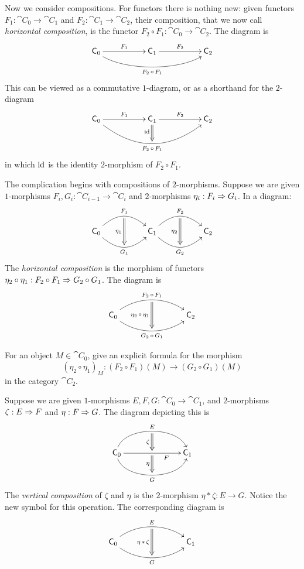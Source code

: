 Now we consider compositions. For functors there is nothing new: given functors 
$F_1 : \cat{C}_{0} \to \cat{C}_{1}$ and 
$F_2 : \cat{C}_{1} \to \cat{C}_{2}$, their composition, that we now call 
{\em horizontal composition}, is the functor
$F_2 \circ F_1 : \cat{C}_{0} \to \cat{C}_{2}$. The diagram is 
\[ \UseTips  \xymatrix @C=12ex @R=6ex {
\cat{C}_0
\ar[r]^(0.5){F_1} 
\ar@(dr,dl)[rr]_(0.5){F_2 \, \circ \, F_1}  
&
\cat{C}_1
\ar[r]^(0.5){F_2} 
&
\cat{C}_2
} \]
This can be viewed as a commutative $1$-diagram, or as a shorthand for the 
$2$-diagram
\[ \UseTips  \xymatrix @C=12ex @R=6ex {
\cat{C}_0
\ar[r]^(0.5){F_1}
\ar @/_3em/ [rr]_(0.5){F_2 \, \circ \, F_1} _(0.5){}="t"
&
\cat{C}_1
\ar[r]^(0.5){F_2} 
\ar@{=>}  ; "t" _(0.5){\opn{id}}
&
\cat{C}_2
} \]
in which $\operatorname{id}$ is the identity $2$-morphism of $F_2 \circ F_1$. 

The complication begins with compositions of $2$-morphisms. 
Suppose we are given $1$-morphisms
$F_i, G_i : \cat{C}_{i - 1} \to \cat{C}_{i}$
and $2$-morphisms $\eta_i : F_i \Rightarrow G_i$. In a diagram: 
\[ \UseTips  \xymatrix @C=12ex @R=6ex {
\cat{C}_0
\ar@(ur,ul)[r]^(0.5){F_1} _(0.5){}="eta1-s"
\ar@(dr,dl)[r]_(0.5){G_1}  ^(0.5){}="eta1-t"
\ar@{=>}  "eta1-s";"eta1-t" _(0.5){\eta_1}
&
\cat{C}_1
\ar@(ur,ul)[r]^(0.5){F_2} _(0.5){}="eta2-s"
\ar@(dr,dl)[r]_(0.5){G_2}  ^(0.5){}="eta2-t"
\ar@{=>}  "eta2-s";"eta2-t" _(0.5){\eta_2}
&
\cat{C}_2
} \]
The {\em horizontal composition} is the morphism of functors 
$\eta_2 \circ \eta_1 : F_2 \circ F_1  \Rightarrow G_2 \circ G_1$.
The diagram is 
\[ \UseTips  \xymatrix @C=18ex @R=6ex {
\cat{C}_0
\ar@(ur,ul)[r]^(0.5){F_2 \, \circ \, F_1} _(0.5){}="eta-s"
\ar@(dr,dl)[r]_(0.5){G_2 \, \circ \, G_1}  ^(0.5){}="eta-t"
\ar@{=>}  "eta-s";"eta-t" _(0.5){\eta_2 \, \circ \, \eta_1}
&
\cat{C}_2
} \] 

\begin{exer} \label{exer:1314}
For an object $M \in \cat{C}_0$, give an explicit formula for the morphism 
\[ (\eta_2 \circ \eta_1)_M : (F_2 \circ F_1)(M) \to (G_2 \circ G_1)(M) \]
in the category $\cat{C}_2$.
\end{exer}

Suppose we are given $1$-morphisms 
$E, F, G : \cat{C}_{0} \to \cat{C}_{1}$, and $2$-morphisms \lb 
$\zeta : E \Rightarrow F$ and $\eta : F \Rightarrow G$. 
The diagram depicting this is
\[ \UseTips  \xymatrix @C=16ex @R=6ex {
\cat{C}_0
\ar@(u,u)[r]^(0.5){E} _(0.5){}="zeta-s"
\ar[r]_(0.7){F}  ^(0.5){}="zeta-t" _(0.5){}="eta-s"
\ar@(d,d)[r]_(0.5){G}  ^(0.5){}="eta-t"
\ar@{=>}  "zeta-s";"zeta-t" _(0.5){\zeta}
\ar@{=>}  "eta-s";"eta-t" _(0.5){\eta}
&
\cat{C}_1
} \] 
The {\em vertical composition} of $\zeta$ and $\eta$ is the $2$-morphism  
$\eta * \zeta : E \to G$.
Notice the new symbol for this operation. 
The corresponding diagram is 
\[ \UseTips  \xymatrix @C=18ex @R=6ex {
\cat{C}_0
\ar@(ur,ul)[r]^(0.5){E} _(0.5){}="eta-s"
\ar@(dr,dl)[r]_(0.5){G}  ^(0.5){}="eta-t"
\ar@{=>}  "eta-s";"eta-t" _(0.5){\eta \, * \, \ze}
&
\cat{C}_1
} \] 

